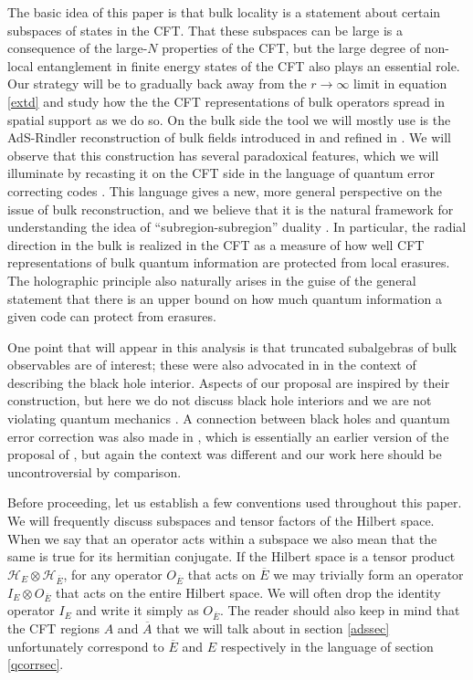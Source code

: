 \documentclass[12pt]{article}
\newcommand{\ol}{\overline}
\begin{document}
The basic idea of this paper is that bulk locality is a statement about certain subspaces of states in the CFT.  That these subspaces can be large is a consequence of the large-$N$ properties of the CFT, but the large degree of non-local entanglement in finite energy states of the CFT also plays an essential role.  Our strategy will be to gradually back away from the $r\to \infty$ limit in equation \eqref{extd} and study how the the CFT representations of bulk operators spread in spatial support as we do so.  On the bulk side the tool we will mostly use is the AdS-Rindler reconstruction of bulk fields introduced in \cite{Hamilton:2006az} and refined in \cite{Morrison:2014jha}.  We will observe that this construction has several paradoxical features, which we will illuminate by recasting it on the CFT side in the language of quantum error correcting codes \cite{shor1995scheme,Gottesman:1997zz}.  This language gives a new, more general perspective on the issue of bulk reconstruction, and we believe that it is the natural framework for understanding the idea of ``subregion-subregion'' duality \cite{Bousso:2012sj,Czech:2012bh,Bousso:2012mh,Hubeny:2012wa}.  In particular, the radial direction in the bulk is realized in the CFT as a measure of how well CFT representations of bulk quantum information are protected from local erasures.  The holographic principle also naturally arises in the guise of the general statement that there is an upper bound on how much quantum information a given code can protect from erasures.

One point that will appear in this analysis is that truncated subalgebras of bulk observables are of interest; these were also advocated in \cite{Papadodimas:2013jku} in the context of describing the black hole interior.  Aspects of our proposal are inspired by their construction, but here we do not discuss black hole interiors and we are not violating quantum mechanics \cite{Harlow:2014yoa}.  A connection between black holes and quantum error correction was also made in \cite{Verlinde:2012cy}, which is essentially an earlier version of the proposal of \cite{Papadodimas:2013jku}, but again the context was different and our work here should be uncontroversial by comparison.

Before proceeding, let us establish a few conventions used throughout this paper.  We will frequently discuss subspaces and tensor factors of the Hilbert space.  When we say that an operator acts within a subspace we also mean that the same is true for its hermitian conjugate.  If the Hilbert space is a tensor product $\mathcal{H}_E \otimes \mathcal{H}_{\ol{E}}$, for any operator $O_{\ol{E}}$ that acts on $\ol{E}$ we may trivially form an operator $I_E \otimes O_{\ol{E}}$ that acts on the entire Hilbert space.  We will often drop the identity operator $I_E$ and write it simply as $O_{\ol{E}}$.  The reader should also keep in mind that the CFT regions $A$ and $\ol{A}$ that we will talk about in section \ref{adssec} unfortunately correspond to $\ol{E}$ and $E$ respectively in the language of section \ref{qcorrsec}.
\end{document}
